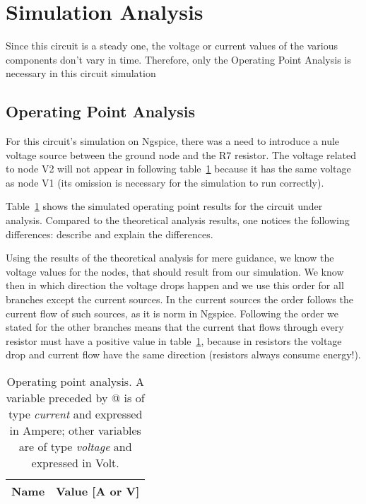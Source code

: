 \section{Simulation Analysis}
\label{sec:simulation}

Since this circuit is a steady one, the voltage or current values of the various components don't vary in time. Therefore, only the Operating Point Analysis is necessary in this circuit simulation

\subsection{Operating Point Analysis}


For this circuit's simulation on Ngspice, there was a need to introduce a nule voltage source between the ground node and the R7 resistor. The voltage related to node V2 will not appear in following table~\ref{tab:op} because it has the same voltage as node V1 (its omission is necessary for the simulation to run correctly).

Table~\ref{tab:op} shows the simulated operating point results for the circuit
under analysis. Compared to the theoretical analysis results, one notices the
following differences: describe and explain the differences.

Using the results of the theoretical analysis for mere guidance, we know the voltage values for the nodes, that should result from our simulation. We know then in which direction the voltage drops happen and we use this order for all branches except the current sources. In the current sources the order follows the current flow of such sources, as it is norm in Ngspice. Following the order we stated for the other branches means that the current that flows through every resistor must have a positive value in table~\ref{tab:op}, because in resistors the voltage drop and current flow have the same direction (resistors always consume energy!).

\begin{table}[h]
  \centering
  \begin{tabular}{|l|r|}
    \hline    
    {\bf Name} & {\bf Value [A or V]} \\ \hline
    
  \end{tabular}
  \caption{Operating point analysis. A variable preceded by @ is of type {\em current}
    and expressed in Ampere; other variables are of type {\it voltage} and expressed in
    Volt.}
  \label{tab:op}
\end{table}

